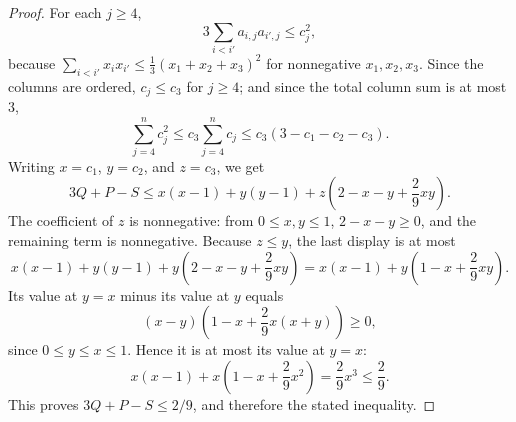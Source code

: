 \begin{proof}
For each $j\ge4$,
\[
3\sum_{i<i'}a_{i,j}a_{i',j}\le c_j^2,
\]
because
$\sum_{i<i'}x_ix_{i'}\le \frac13(x_1+x_2+x_3)^2$ for nonnegative
$x_1,x_2,x_3$.  Since the columns are ordered, $c_j\le c_3$ for $j\ge4$; and
since the total column sum is at most $3$,
\[
\sum_{j=4}^n c_j^2\le c_3\sum_{j=4}^n c_j
\le c_3(3-c_1-c_2-c_3).
\]
Writing $x=c_1$, $y=c_2$, and $z=c_3$, we get
\[
3Q+P-S
\le x(x-1)+y(y-1)+z\left(2-x-y+\frac29xy\right).
\]
The coefficient of $z$ is nonnegative: from $0\le x,y\le1$,
$2-x-y\ge0$, and the remaining term is nonnegative.  Because $z\le y$, the
last display is at most
\[
x(x-1)+y(y-1)+y\left(2-x-y+\frac29xy\right)
=x(x-1)+y\left(1-x+\frac29xy\right).
\]
Its value at $y=x$ minus its value at $y$ equals
\[
(x-y)\left(1-x+\frac29x(x+y)\right)\ge0,
\]
since $0\le y\le x\le1$. Hence it is at most its value at $y=x$:
\[
x(x-1)+x\left(1-x+\frac29x^2\right)=\frac29x^3\le\frac29 .
\]
This proves $3Q+P-S\le2/9$, and therefore the stated inequality.
\end{proof}
